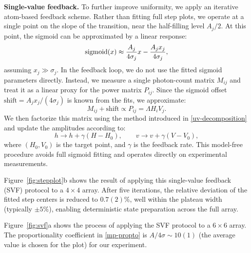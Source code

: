 \textbf{Single-value feedback.}
To further improve uniformity, we apply an iterative atom-based feedback scheme. Rather than fitting full step plots, we operate at a single point on the slope of the transition, near the half-filling level $A_j / 2$. At this point, the sigmoid can be approximated by a linear response:
\begin{equation*}
    \mathop{\mathrm{sigmoid}}\nolimits(x) \approx \frac{A_j}{4 \sigma_j} x - \frac{A_j x_j}{4 \sigma_j},
\end{equation*}
assuming $x_j \gg \sigma_j$.  In the feedback loop, we do not use the fitted sigmoid parameters directly. Instead, we measure a single photon-count matrix $M_{ij}$ and treat it as a linear proxy for the power matrix $P_{ij}$. Since the sigmoid offset $\mathrm{shift} = A_j x_j / (4 \sigma_j)$ is known from the fits, we approximate:
\begin{equation}
    \label{mp-propto}
    M_{ij} + \mathrm{shift} \propto P_{ij} = \Lambda H_i V_j.
\end{equation}
We then factorize this matrix using the method introduced in \eqref{uv-decomposition} and update the amplitudes according to:
\begin{equation*}
    h \rightarrow h + \gamma (H - H_0), \qquad
    v \rightarrow v + \gamma (V - V_0),
\end{equation*}
where $(H_0, V_0)$ is the target point, and $\gamma$ is the feedback rate. This model-free procedure avoids full sigmoid fitting and operates directly on experimental measurements.

Figure~\ref{fig:stepplot}b shows the result of applying this single-value feedback (SVF) protocol to a $4 \times 4$ array. After five iterations, the relative deviation of the fitted step centers is reduced to $0.7(2)\%$, well within the plateau width (typically $\pm5\%$), enabling deterministic state preparation across the full array. 

Figure~\ref{fig:svf}a shows the process of applying the SVF protocol to a $6 \times 6$ array. The proportionality coefficient in \eqref{mp-propto} is $A/4\sigma \sim 10(1)$ (the average value is chosen for the plot) for our experiment.